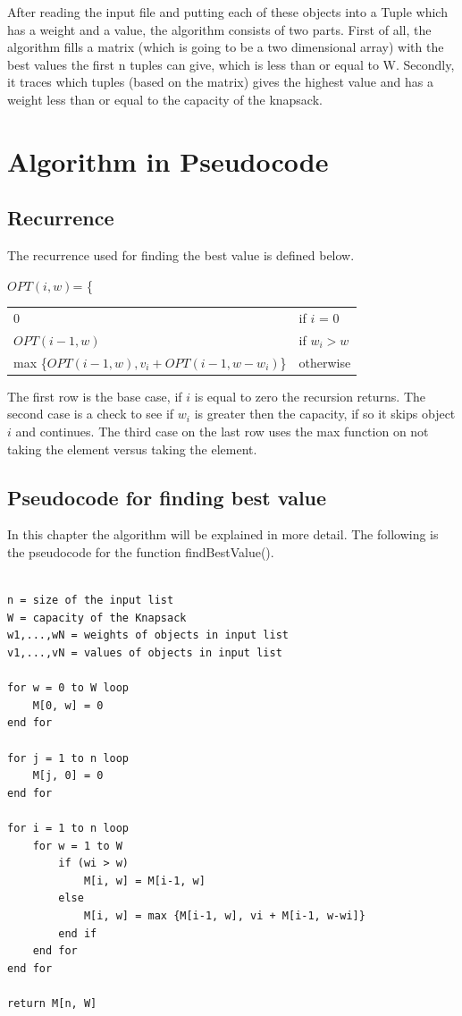 \documentclass{inc/mas}
\begin{document}
After reading the input file and putting each of these objects into a Tuple which has a weight and a value, the algorithm consists of two parts. First of all, the algorithm fills a matrix (which is going to be a two dimensional array) with the best values the first n tuples can give, which is less than or equal to W. Secondly, it traces which tuples (based on the matrix) gives the highest value and has a weight less than or equal to the capacity of the knapsack. \\ 
 

\section{Algorithm in Pseudocode}

\subsection{Recurrence}
\label{Recurrance}

The recurrence used for finding the best value is defined below. \citep{Tardos} {\color{red}{Add referens to slides?}}

$OPT(i,w)$= \Bigg\{ \begin{tabular}{ll} 
0 & if $i$ = 0 \\
$OPT(i-1, w)$ & if $w_i > w$ \\
max \{$OPT(i-1, w), v_i + OPT(i-1, w-w_i )$\} & otherwise\\
\end{tabular}

The first row is the base case, if $i$ is equal to zero the recursion returns. The second case is a check to see if $w_i$ is greater then the capacity, if so it skips object $i$ and continues. The third case on the last row uses the max function on not taking the element versus taking the element. 

\subsection{Pseudocode for finding best value}
In this chapter the algorithm will be explained in more detail. The following is the pseudocode for the function findBestValue(). {\color{red}{Add referens to slides?}}\newline

\begin{lstlisting}

n = size of the input list
W = capacity of the Knapsack
w1,...,wN = weights of objects in input list
v1,...,vN = values of objects in input list

for w = 0 to W loop
	M[0, w] = 0
end for

for j = 1 to n loop
	M[j, 0] = 0
end for

for i = 1 to n loop
	for w = 1 to W
		if (wi > w)
			M[i, w] = M[i-1, w]
		else
			M[i, w] = max {M[i-1, w], vi + M[i-1, w-wi]}
		end if
	end for
end for

return M[n, W]

\end{lstlisting}
\end{document}
